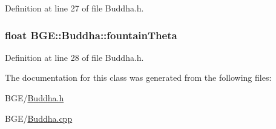 Definition at line 27 of file Buddha.\-h.

\hypertarget{class_b_g_e_1_1_buddha_a7b87e28db8a5a220a862e7c1e3a27973}{
\subsubsection[{fountain\-Theta}]{\setlength{\rightskip}{0pt plus 5cm}float B\-G\-E\-::\-Buddha\-::fountain\-Theta}}\label{class_b_g_e_1_1_buddha_a7b87e28db8a5a220a862e7c1e3a27973}


Definition at line 28 of file Buddha.\-h.



The documentation for this class was generated from the following files\-:\begin{DoxyCompactItemize}
\item 
B\-G\-E/\hyperlink{_buddha_8h}{Buddha.\-h}\item 
B\-G\-E/\hyperlink{_buddha_8cpp}{Buddha.\-cpp}\end{DoxyCompactItemize}

